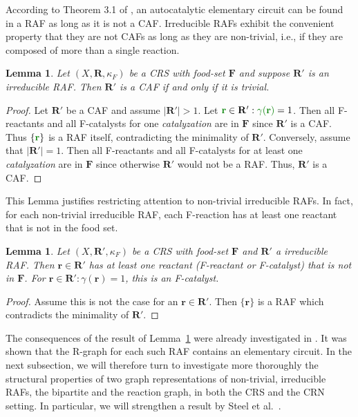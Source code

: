 \documentclass[pdflatex]{sn-jnl}
\theoremstyle{thmstyleone}%
\newtheorem{lemma}[theorem]{Lemma}%
\theoremstyle{examplesty}%
\theoremstyle{thmstylethree}%
\newcommand{\food}{\ensuremath{\mathbf{F}}}
\newcommand{\fr}[0]{\mathbf{r}}
\newcommand{\RAF}[0]{\mathbf{R}'}
\newcommand{\cat}{\kappa_F}
\newcommand{\rgen}{\gamma}
\newcommand{\PFS}[1]{\begingroup\color{cyan}#1\endgroup}
\newcommand{\TG}[1]{\begingroup\color{middlegreen}#1\endgroup}
\begin{document}
According to Theorem 3.1 of \cite{golnik_bridging_2026}, an autocatalytic
elementary circuit can be found in a RAF as long as it is not a
CAF. Irreducible RAFs exhibit the convenient property that they are not
CAFs as long as they are non-trivial, i.e., if they are composed of more
than a single reaction.
\vspace{6pt}
\begin{lemma}\label{lem:trivRAFCAF}
  Let $(X,\mathbf{R},\cat)$ be a CRS with food-set $\food$ and suppose
  $\RAF$ is an irreducible RAF. Then $\RAF$ is a CAF if and only if it is
  trivial.
\end{lemma}
\begin{proof}
  Let $\RAF$ be a CAF and assume $|\RAF|>1$. Let $\TG{\fr}\in \RAF:
  \TG{\rgen(\fr)}=1$. Then all F-reactants and all F-catalysts for one
  \emph{catalyzation} are in $\food$ since $\RAF$ is a CAF. Thus $\{\TG{\fr}\}$ is
  a RAF itself, contradicting the minimality of $\RAF$.  Conversely, assume
  that $|\RAF|=1$. Then all F-reactants and all F-catalysts for at least
  one \emph{catalyzation} are in $\food$ since otherwise $\RAF$ would not
  be a RAF. Thus, $\RAF$ is a CAF.
\end{proof}
\vspace{6pt}
%
This Lemma justifies \PFS{restricting attention to} non-trivial irreducible
RAFs. In fact, for each non-trivial irreducible RAF, each F-reaction has at
least one reactant that is not in the food set.
\vspace{6pt}
\begin{lemma}\label{lem:OneReac}
  Let $(X,\RAF,\cat)$ be a CRS with food-set $\food$ and $\RAF$ a
  irreducible RAF.  Then $\fr\in \RAF$ has at least one reactant
  (F-reactant or F-catalyst) that is not in $\food$. For $\fr\in \RAF:
  \rgen(\fr)=1$, this is an F-catalyst.
\end{lemma}
\begin{proof}
  Assume this is not the case for an $\fr\in \RAF$. Then $\{\fr\}$ is a RAF
  which contradicts the minimality of $\RAF$.
\end{proof}
\vspace{6pt}

The consequences of the result of Lemma~\ref{lem:OneReac} were already
investigated in \cite{steel_minimal_2013}. It was shown that the R-graph
for each such RAF contains an elementary circuit. In the next subsection,
we will therefore turn to investigate more thoroughly the structural
properties of two graph representations of non-trivial, irreducible RAFs,
the bipartite and the reaction graph, in both the CRS and the CRN
setting. In particular, we will strengthen a result by Steel et
al.\ \cite{steel_minimal_2013}.
\end{document}
